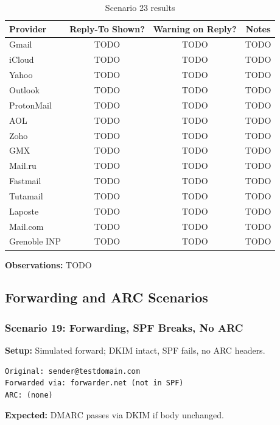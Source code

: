 \documentclass[11pt,a4paper]{article}
\begin{document}
\begin{table}[h]
\centering
\small
\begin{tabular}{lccc}
\toprule
\textbf{Provider} & \textbf{Reply-To Shown?} & \textbf{Warning on Reply?} & \textbf{Notes} \\
\midrule
Gmail & TODO & TODO & TODO \\
iCloud & TODO & TODO & TODO \\
Yahoo & TODO & TODO & TODO \\
Outlook & TODO & TODO & TODO \\
ProtonMail & TODO & TODO & TODO \\
AOL & TODO & TODO & TODO \\
Zoho & TODO & TODO & TODO \\
GMX & TODO & TODO & TODO \\
Mail.ru & TODO & TODO & TODO \\
Fastmail & TODO & TODO & TODO \\
Tutamail & TODO & TODO & TODO \\
Laposte & TODO & TODO & TODO \\
Mail.com & TODO & TODO & TODO \\
Grenoble INP & TODO & TODO & TODO \\
\bottomrule
\end{tabular}
\caption{Scenario 23 results}
\end{table}

\textbf{Observations:} TODO

\subsection{Forwarding and ARC Scenarios}

\subsubsection{Scenario 19: Forwarding, SPF Breaks, No ARC}

\textbf{Setup:} Simulated forward; DKIM intact, SPF fails, no ARC headers.

\begin{lstlisting}
Original: sender@testdomain.com
Forwarded via: forwarder.net (not in SPF)
ARC: (none)
\end{lstlisting}

\textbf{Expected:} DMARC passes via DKIM if body unchanged.
\end{document}
